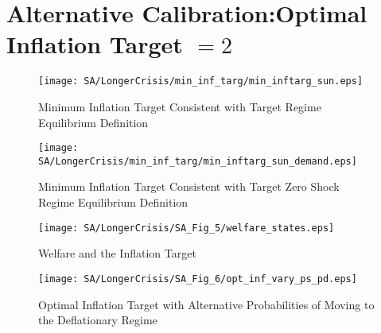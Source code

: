 \documentclass[11pt]{article}
\begin{document}
\section{Alternative Calibration:Optimal Inflation Target $=2$}
\begin{figure}[!htb]
	\begin{center}
		\caption{Minimum Inflation Target Consistent with Target Regime Equilibrium Definition}
		\texttt{[image: SA/LongerCrisis/min\_inf\_targ/min\_inftarg\_sun.eps]}\\
	\end{center}
\end{figure}
\begin{figure}[!htb]
	\begin{center}
		\caption{Minimum Inflation Target Consistent with Target Zero Shock Regime Equilibrium Definition}
		\texttt{[image: SA/LongerCrisis/min\_inf\_targ/min\_inftarg\_sun\_demand.eps]}\\
	\end{center}
\end{figure}
\begin{figure}[!htb]
	\begin{center}
		\caption{Welfare and the Inflation Target}
		\texttt{[image: SA/LongerCrisis/SA\_Fig\_5/welfare\_states.eps]}\\
	\end{center}
\end{figure}
\begin{figure}[!htb]
	\begin{center}
		\caption{Optimal Inflation Target with Alternative Probabilities of Moving to the Deflationary Regime}
		\texttt{[image: SA/LongerCrisis/SA\_Fig\_6/opt\_inf\_vary\_ps\_pd.eps]}\\
	\end{center}
\end{figure}
\end{document}
